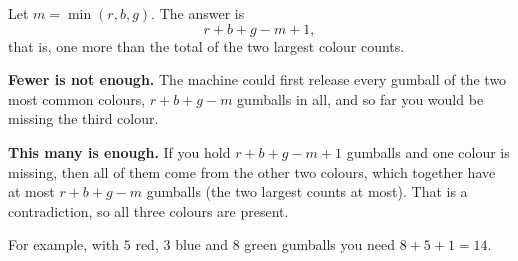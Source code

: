 Let $m=\min(r,b,g)$. The answer is
\[
\boxed{r+b+g-m+1},
\]
that is, one more than the total of the two largest colour counts.

\textbf{Fewer is not enough.} The machine could first release every gumball of the two most common colours, $r+b+g-m$ gumballs in all, and so far you would be missing the third colour.

\textbf{This many is enough.} If you hold $r+b+g-m+1$ gumballs and one colour is missing, then all of them come from the other two colours, which together have at most $r+b+g-m$ gumballs (the two largest counts at most). That is a contradiction, so all three colours are present.

For example, with $5$ red, $3$ blue and $8$ green gumballs you need $8+5+1=14$.
